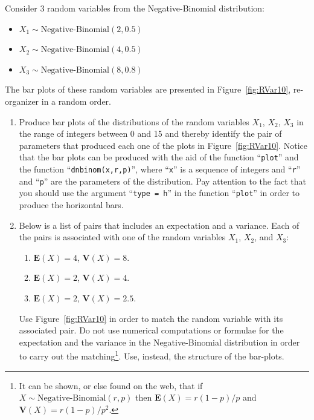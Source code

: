 \documentclass[]{krantz}
\newcommand{\Expec}{\mathbf{E}}
\newcommand{\Var}{\mathbf{V}}
\theoremstyle{definition}
\theoremstyle{definition}
\theoremstyle{definition}
\theoremstyle{remark}
\begin{document}
Consider 3 random variables from the Negative-Binomial distribution:

\begin{itemize}
\item
  \(X_1 \sim \mbox{Negative-Binomial}(2,0.5)\)
\item
  \(X_2 \sim \mbox{Negative-Binomial}(4,0.5)\)
\item
  \(X_3 \sim \mbox{Negative-Binomial}(8,0.8)\)
\end{itemize}

The bar plots of these random variables are presented in
Figure~\ref{fig:RVar10}, re-organizer in a random order.

\begin{enumerate}
\def\labelenumi{\arabic{enumi}.}
\item
  Produce bar plots of the distributions of the random variables
  \(X_1\), \(X_2\), \(X_3\) in the range of integers between 0 and 15 and
  thereby identify the pair of parameters that produced each one of
  the plots in Figure~\ref{fig:RVar10}. Notice that the bar plots
  can be produced with the aid of the function ``\texttt{plot}'' and the
  function ``\texttt{dnbinom(x,r,p)}'', where ``\texttt{x}'' is a sequence of integers
  and ``\texttt{r}'' and ``\texttt{p}'' are the parameters of the distribution. Pay
  attention to the fact that you should use the argument ``\texttt{type\ =\ h}''
  in the function ``\texttt{plot}'' in order to produce the horizontal bars.
\item
  Below is a list of pairs that includes an expectation and a
  variance. Each of the pairs is associated with one of the random
  variables \(X_1\), \(X_2\), and \(X_3\):

  \begin{enumerate}
  \def\labelenumii{\arabic{enumii}.}
  \item
    \(\Expec(X) = 4\), \(\Var(X) = 8\).
  \item
    \(\Expec(X) = 2\), \(\Var(X) = 4\).
  \item
    \(\Expec(X) = 2\), \(\Var(X) = 2.5\).
  \end{enumerate}

  Use Figure~\ref{fig:RVar10} in order to match the random
  variable with its associated pair. Do not use numerical computations
  or formulae for the expectation and the variance in the
  Negative-Binomial distribution in order to carry out the
  matching\footnote{It can be shown, or else found on the web, that if
    \(X\sim \mbox{Negative-Binomial}(r,p)\) then \(\Expec(X) = r(1-p)/p\)
    and \(\Var(X) = r(1-p)/p^2\).}. Use, instead, the structure of the bar-plots.
\end{enumerate}
\end{document}

